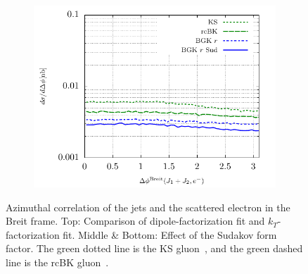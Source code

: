 \documentclass[11pt]{article}
\begin{document}
\begin{figure}[p]
\begin{subfigure}{0.5\textwidth}
	\end{subfigure}
	\begin{subfigure}{0.5\textwidth}
	\includegraphics[width=\textwidth]{plots/plotBGK3}
	\end{subfigure}
	\caption{ Azimuthal correlation of the jets and the scattered electron in the Breit frame. Top: Comparison of dipole-factorization fit and $k_T$-factorization fit. Middle \& Bottom: Effect of the Sudakov form factor. The green dotted line is the KS gluon~\cite{vanHameren:2021sqc}, and the green dashed line is the rcBK gluon~\cite{Albacete:2010sy}.}
	\label{fig:je-breit}
\end{figure}
\end{document}
